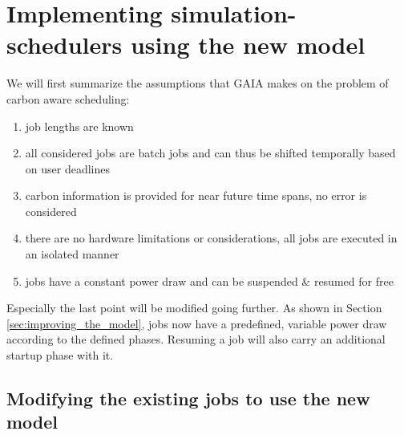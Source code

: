 % 

\section{Implementing simulation-schedulers using the new model}

We will first summarize the assumptions that GAIA makes on the problem of carbon aware scheduling:

\begin{enumerate}
    \item job lengths are known
    \item all considered jobs are batch jobs and can thus be shifted temporally based on user deadlines
    \item carbon information is provided for near future time spans, no error is considered
    \item there are no hardware limitations or considerations, all jobs are executed in an isolated manner
    \item jobs have a constant power draw and can be suspended \& resumed for free
\end{enumerate}

Especially the last point will be modified going further. As shown in Section \ref{sec:improving_the_model}, jobs now have a predefined, variable power draw according to the defined phases. Resuming a job will also carry an additional startup phase with it.

\subsection{Modifying the existing jobs to use the new model}

